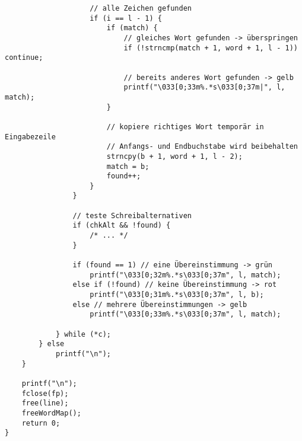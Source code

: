 \documentclass[a4paper,10pt,ngerman]{scrartcl}
\begin{document}
\begin{lstlisting}
                    // alle Zeichen gefunden
                    if (i == l - 1) {
                        if (match) {
                            // gleiches Wort gefunden -> überspringen
                            if (!strncmp(match + 1, word + 1, l - 1)) continue;

                            // bereits anderes Wort gefunden -> gelb
                            printf("\033[0;33m%.*s\033[0;37m|", l, match);
                        }

                        // kopiere richtiges Wort temporär in Eingabezeile
                        // Anfangs- und Endbuchstabe wird beibehalten
                        strncpy(b + 1, word + 1, l - 2);
                        match = b;
                        found++;
                    }
                }

                // teste Schreibalternativen
                if (chkAlt && !found) {
                    /* ... */
                }

                if (found == 1) // eine Übereinstimmung -> grün
                    printf("\033[0;32m%.*s\033[0;37m", l, match);
                else if (!found) // keine Übereinstimmung -> rot
                    printf("\033[0;31m%.*s\033[0;37m", l, b);
                else // mehrere Übereinstimmungen -> gelb
                    printf("\033[0;33m%.*s\033[0;37m", l, match);

            } while (*c);
        } else
            printf("\n");
    }

    printf("\n");
    fclose(fp);
    free(line);
    freeWordMap();
    return 0;
}

\end{lstlisting}
\end{document}
